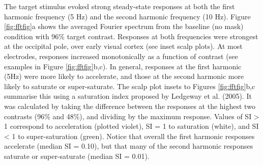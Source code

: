 \documentclass[]{article}
\begin{document}
The target stimulus evoked strong steady-state responses at both the first harmonic frequency (5 Hz) and the second harmonic frequency (10 Hz). Figure \ref{fig:fftfig}a shows the averaged Fourier spectrum from the baseline (no mask) condition with 96\% target contrast. Responses at both frequencies were strongest at the occipital pole, over early visual cortex (see inset scalp plots). At most electrodes, responses increased monotonically as a function of contrast (see examples in Figure \ref{fig:fftfig}b,c). In general, responses at the first harmonic (5Hz) were more likely to accelerate, and those at the second harmonic more likely to saturate or super-saturate. The scalp plot insets to Figures \ref{fig:fftfig}b,c summarise this using a saturation index proposed by Ledgeway et al. (2005). It was calculated by taking the difference between the responses at the highest two contrasts (96\% and 48\%), and dividing by the maximum response. Values of SI \textgreater{} 1 correspond to acceleration (plotted violet), SI = 1 to saturation (white), and SI \textless{} 1 to super-saturation (green). Notice that overall the first harmonic responses accelerate (median SI = 0.10), but that many of the second harmonic responses saturate or super-saturate (median SI = 0.01).
\end{document}
